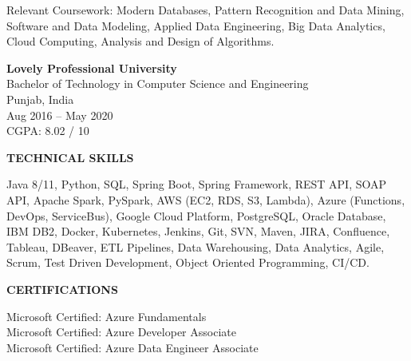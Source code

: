 \documentclass[letterpaper,12pt]{article}
\begin{document}
Relevant Coursework: Modern Databases, Pattern Recognition and Data Mining, Software and Data Modeling, Applied Data Engineering, Big Data Analytics, Cloud Computing, Analysis and Design of Algorithms.

\vspace{4pt}

\textbf{Lovely Professional University} \\
Bachelor of Technology in Computer Science and Engineering \\
Punjab, India \\
Aug 2016 -- May 2020 \\
CGPA: 8.02 / 10

\vspace{6pt}

\textbf{TECHNICAL SKILLS}

\vspace{4pt}

Java 8/11, Python, SQL, Spring Boot, Spring Framework, REST API, SOAP API, Apache Spark, PySpark, AWS (EC2, RDS, S3, Lambda), Azure (Functions, DevOps, ServiceBus), Google Cloud Platform, PostgreSQL, Oracle Database, IBM DB2, Docker, Kubernetes, Jenkins, Git, SVN, Maven, JIRA, Confluence, Tableau, DBeaver, ETL Pipelines, Data Warehousing, Data Analytics, Agile, Scrum, Test Driven Development, Object Oriented Programming, CI/CD.

\vspace{6pt}

\textbf{CERTIFICATIONS}

\vspace{4pt}

Microsoft Certified: Azure Fundamentals \\
Microsoft Certified: Azure Developer Associate \\
Microsoft Certified: Azure Data Engineer Associate
\end{document}
